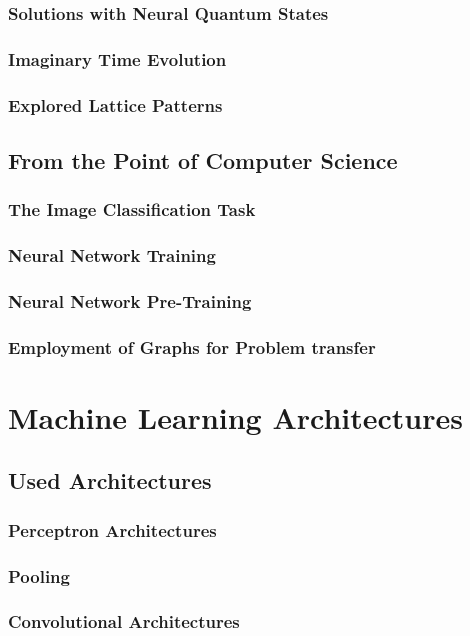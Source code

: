 \documentclass[
headings=optiontohead,              %
12pt,                               %
DIV=13,                             %
twoside=false,                      %
open=right,                         %
BCOR=10mm,                          %
toc=bibliographynumbered            %
]{scrreport}
\begin{document}
        \subsection{Solutions with Neural Quantum States}
        \subsection{Imaginary Time Evolution}
        \subsection{Explored Lattice Patterns}
    \section{From the Point of Computer Science}
        \subsection{The Image Classification Task}
        \subsection{Neural Network Training}
        \subsection{Neural Network Pre-Training}
        \subsection{Employment of Graphs for Problem transfer}

\chapter{Machine Learning Architectures}
    \section{Used Architectures}
        \subsection{Perceptron Architectures}
        \subsection{Pooling}
        \subsection{Convolutional Architectures}
\end{document}
